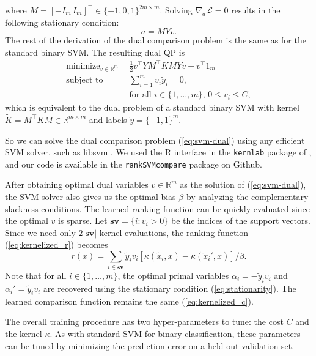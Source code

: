 \documentclass{article}
\newcommand{\RR}{\mathbb R}
\DeclareMathOperator*{\minimize}{minimize}
\begin{document}
where $M=[-I_m \, I_m]^\intercal\in\{-1,0,1\}^{2m\times m}$. Solving
$\nabla_a \mathcal L=0$ results in the following stationary condition:
\begin{equation}
  \label{eq:stationarity}
  a = M Y v.
\end{equation}
The rest of the derivation of the dual comparison problem is the same
as for the standard binary SVM. The resulting dual QP is
\begin{equation}
  \begin{aligned}
    \label{eq:svm-dual}
    \minimize_{v\in\RR^m}\ \ &
    \frac 1 2 v^\intercal Y M^\intercal K M Y v - v^\intercal 1_m\\
    \text{subject to}\ \ &
    \sum_{i=1}^m v_i \tilde y_i = 0,\\
&    \text{for all $i\in\{1,\dots,m\}$, } 0\leq v_i\leq C,
  \end{aligned}
\end{equation}
which is equivalent to the dual problem of a standard binary SVM with
kernel $\tilde K = M^\intercal K M\in\RR^{m\times m}$ and labels
$\tilde y=\{-1,1\}^m$.

So we can solve the dual comparison problem (\ref{eq:svm-dual}) using
any efficient SVM solver, such as libsvm \citep{libsvm}. We used the R
interface in the \texttt{kernlab} package of \citet{kernlab}, and our
code is available in the \texttt{rankSVMcompare} package on Github.

After obtaining optimal dual variables $v\in\RR^m$ as the solution of
(\ref{eq:svm-dual}), the SVM solver also gives us the optimal bias
$\beta$ by analyzing the complementary slackness conditions.
The learned ranking function can be quickly evaluated since the
optimal $v$ is sparse. Let $\textbf{sv}=\{i: v_i > 0\}$ be the indices
of the support vectors. Since we need only $2|\textbf{sv}|$ kernel
evaluations, the ranking function (\ref{eq:kernelized_r}) becomes
\begin{equation}
  \label{eq:r_sv}
  r(x)= 
  \sum_{i\in \textbf{sv}}
  \tilde y_i v_i\left[ 
    \kappa(\tilde x_i, x)
    - \kappa(\tilde x_i', x)
  \right]/\beta.
\end{equation}
Note that for all $i\in\{1,\dots,m\}$, the optimal primal variables
$\alpha_i=-\tilde y_i v_i$ and $\alpha_i'=\tilde y_i v_i$ are
recovered using the stationary condition (\ref{eq:stationarity}). The
learned comparison function remains the same (\ref{eq:kernelized_c}).

The overall training procedure has two hyper-parameters to tune: the
cost $C$ and the kernel $\kappa$. As with standard SVM for binary
classification, these parameters can be tuned by minimizing the
prediction error on a held-out validation set.
\end{document}
